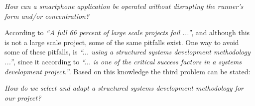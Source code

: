 \begin{center}
\textit{How can a smartphone application be operated without disrupting the runner's form and/or concentration?}
\end{center}
\pagebreak


\noindent According to \citet{gartner:failure}{} \textit{``A full 66 percent of large scale projects fail ...”}, and although this is not a large scale project, some of the same pitfalls exist.
One way to avoid some of these pitfalls, is \textit{``... using a structured systems development methodology ...”}, since it according to \citet{dorsey:methodologyReason} \textit{``... is one of the critical success factors in a systems development project.”}.
Based on this knowledge the third problem can be stated:

\begin{center}
	\textit{How do we select and adapt a structured systems development methodology for our project?}
\end{center}